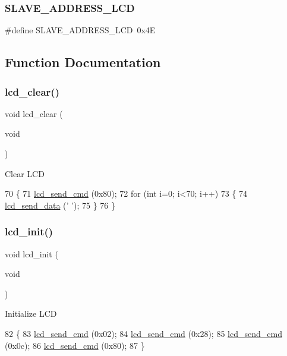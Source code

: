 \subsubsection{\texorpdfstring{S\+L\+A\+V\+E\+\_\+\+A\+D\+D\+R\+E\+S\+S\+\_\+\+L\+CD}{SLAVE\_ADDRESS\_LCD}}
{\footnotesize\ttfamily \#define S\+L\+A\+V\+E\+\_\+\+A\+D\+D\+R\+E\+S\+S\+\_\+\+L\+CD~0x4E}



\subsection{Function Documentation}
\mbox{\label{i2c-lcd_8c_ad235a86241458b1e7b8771688bfdaf9a}} 
\subsubsection{\texorpdfstring{lcd\+\_\+clear()}{lcd\_clear()}}
{\footnotesize\ttfamily void lcd\+\_\+clear (\begin{DoxyParamCaption}\item[{void}]{ }\end{DoxyParamCaption})}

Clear L\+CD 
\begin{DoxyCode}
70 \{
71     \hyperlink{i2c-lcd_8c_a0934da706080d3b0b3b2f04c9d044e67}{lcd\_send\_cmd} (0x80);
72     \textcolor{keywordflow}{for} (\textcolor{keywordtype}{int} i=0; i<70; i++)
73     \{
74         \hyperlink{i2c-lcd_8c_ac6c9650fc3a35bf393a6bf535e6d0b9f}{lcd\_send\_data} (\textcolor{charliteral}{' '});
75     \}
76 \}
\end{DoxyCode}
\mbox{\label{i2c-lcd_8c_a6842775ba83d166f02b8fef8bb63b1e6}} 
\subsubsection{\texorpdfstring{lcd\+\_\+init()}{lcd\_init()}}
{\footnotesize\ttfamily void lcd\+\_\+init (\begin{DoxyParamCaption}\item[{void}]{ }\end{DoxyParamCaption})}

Initialize L\+CD 
\begin{DoxyCode}
82 \{
83     \hyperlink{i2c-lcd_8c_a0934da706080d3b0b3b2f04c9d044e67}{lcd\_send\_cmd} (0x02);
84     \hyperlink{i2c-lcd_8c_a0934da706080d3b0b3b2f04c9d044e67}{lcd\_send\_cmd} (0x28);
85     \hyperlink{i2c-lcd_8c_a0934da706080d3b0b3b2f04c9d044e67}{lcd\_send\_cmd} (0x0c);
86     \hyperlink{i2c-lcd_8c_a0934da706080d3b0b3b2f04c9d044e67}{lcd\_send\_cmd} (0x80);
87 \}
\end{DoxyCode}
\mbox{\label{i2c-lcd_8c_a0934da706080d3b0b3b2f04c9d044e67}} 
